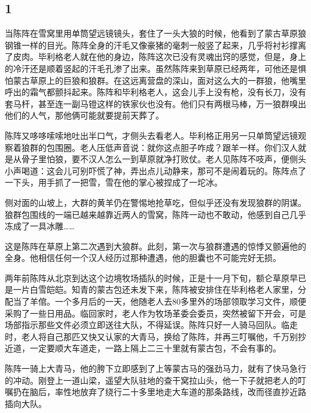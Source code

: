 \subsection*{1}

\par 当陈阵在雪窝里用单筒望远镜镜头，套住了一头大狼的时候，他看到了蒙古草原狼钢锥一样的目光。陈阵全身的汗毛又像豪猪的毫刺一般竖了起来，几乎将衬衫撑离了皮肉。毕利格老人就在他的身边，陈阵这次已没有灵魂出窍的感觉，但是，身上的冷汗还是顺着竖起的汗毛孔渗了出来。虽然陈阵来到草原已经两年，可他还是惧怕蒙古草原上的巨狼和狼群。在这远离营盘的深山，面对这么大的一群狼，他嘴里呼出的霜气都颤抖起来。陈阵和毕利格老人，这会儿手上没有枪，没有长刀，没有套马杆，甚至连一副马镫这样的铁家伙也没有。他们只有两根马棒，万一狼群嗅出他们的人气，那他俩可能就要提前天葬了。
\par 陈阵又哆哆嗦嗦地吐出半口气，才侧头去看老人。毕利格正用另一只单筒望远镜观察着狼群的包围圈。老人压低声音说：就你这点胆子咋成？跟羊一样。你们汉人就是从骨子里怕狼，要不汉人怎么一到草原就净打败仗。老人见陈阵不吱声，便侧头小声喝道：这会儿可别吓慌了神，弄出点儿动静来，那可不是闹着玩的。陈阵点了一下头，用手抓了一把雪，雪在他的掌心被捏成了一坨冰。
\par 侧对面的山坡上，大群的黄羊仍在警惕地抢草吃，但似乎还没有发现狼群的阴谋。狼群包围线的一端已越来越靠近两人的雪窝，陈阵一动也不敢动，他感到自己几乎冻成了一具冰雕……
\par 这是陈阵在草原上第二次遇到大狼群。此刻，第一次与狼群遭遇的惊悸又颤遍他的全身。他相信任何一个汉人经历过那种遭遇，他的胆囊也不可能完好无损。
\par 两年前陈阵从北京到达这个边境牧场插队的时候，正是十一月下旬，额仑草原早已是一片白雪皑皑。知青的蒙古包还未发下来，陈阵被安排住在毕利格老人家里，分配当了羊倌。一个多月后的一天，他随老人去80多里外的场部领取学习文件，顺便采购了一些日用品。临回家时，老人作为牧场革委会委员，突然被留下开会，可是场部指示那些文件必须立即送往大队，不得延误。陈阵只好一人骑马回队。临走时，老人将自己那匹又快又认家的大青马，换给了陈阵，并再三叮嘱他，千万别抄近道，一定要顺大车道走，一路上隔上二三十里就有蒙古包，不会有事的。
\par 陈阵一骑上大青马，他的胯下立即感到了上等蒙古马的强劲马力，就有了快马急行的冲动。刚登上一道山梁，遥望大队驻地的查干窝拉山头，他一下子就把老人的叮嘱扔在脑后，率性地放弃了绕行二十多里地走大车道的那条路线，改而径直抄近路插向大队。
